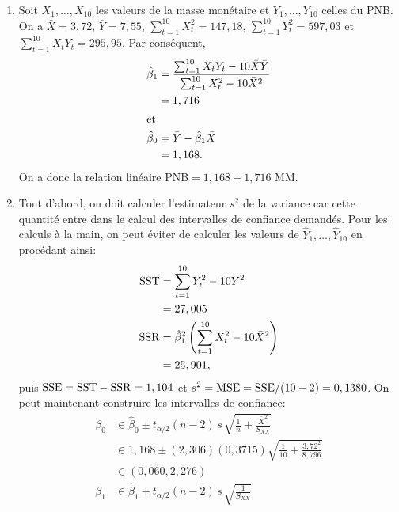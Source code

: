 \begin{solution}{2.16}
    \begin{enumerate}
    \item Soit $X_1, \dots, X_{10}$ les valeurs de la masse monétaire
      et $Y_1, \dots, Y_{10}$ celles du PNB. On a $\bar{X} = 3,72$,
      $\bar{Y} = 7,55$, $\sum_{t = 1}^{10} X_t^2 = 147,18$, $\sum_{t =
        1}^{10} Y_t^2 = 597,03$ et $\sum_{t = 1}^{10} X_t Y_t =
      295,95$. Par conséquent,
      \begin{align*}
        \hat{\beta}_1
        &= \frac{\sum_{t=1}^{10} X_t Y_t - 10 \bar{X} \bar{Y}}{%
          \sum_{t=1}^{10} X_t^2 - 10 \bar{X}^2} \\
        &= 1,716 \\
        \intertext{et}
        \hat{\beta}_0
        &= \bar{Y} - \hat{\beta}_1 \bar{X} \\
        &= 1,168.
      \end{align*}
      On a donc la relation linéaire $\text{PNB} = 1,168 + 1,716
      \text{ MM}$.
    \item Tout d'abord, on doit calculer l'estimateur $s^2$ de la
      variance car cette quantité entre dans le calcul des intervalles
      de confiance demandés. Pour les calculs à la main, on peut
      éviter de calculer les valeurs de $\hat{Y}_1, \dots,
      \hat{Y}_{10}$ en procédant ainsi:
      \begin{align*}
        \mathrm{SST}
        &= \sum_{t=1}^{10} Y_t^2 - 10 \bar{Y}^2 \\
        &= 27,005 \\
        \mathrm{SSR}
        &= \hat{\beta}_1^2
        \left(
          \sum_{t=1}^{10} X_t^2 - 10 \bar{X}^2
        \right) \\
        &= 25,901,
      \end{align*}
      puis $\mathrm{SSE} = \mathrm{SST} - \mathrm{SSR} = 1,104$ et $s^2 = \mathrm{MSE} = \mathrm{SSE}/(10 - 2)
      = 0,1380$.  On peut maintenant construire les intervalles de
      confiance:
      \begin{align*}
        \beta_0
        &\in \hat{\beta}_0 \pm t_{\alpha/2}(n - 2)\, s\,
        \sqrt{\frac{1}{n} + \frac{\bar{X}^2}{S_{XX}}} \\
        &\in 1,168 \pm (2,306) (0,3715)
        \sqrt{\frac{1}{10} + \frac{3,72^2}{8,796}} \\
        &\in (0,060, 2,276) \\
        \beta_1
        &\in \hat{\beta}_1 \pm t_{\alpha/2}(n - 2)\, s\,
        \sqrt{\frac{1}{S_{XX}}} \\

\end{align*}
\end{enumerate}
\end{solution}
